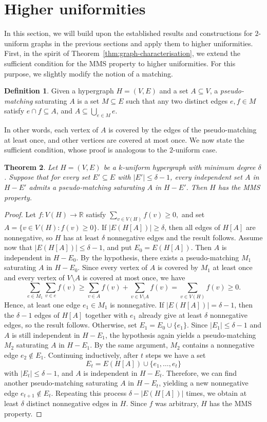 \documentclass[12pt,UKenglish]{amsart}
\newtheorem{thm}{Theorem}[section]
\theoremstyle{plain}
\theoremstyle{definition}
\newtheorem{defn}[thm]{Definition}
\theoremstyle{remark}
\begin{document}
\section{Higher uniformities}\label{sec:high-uniformities}
In this section, we will build upon the established results and constructions for $2$-uniform graphs in the previous sections and apply them to higher uniformities.
 First, in the spirit of Theorem~\ref{thm:graph-characterisation}, we extend the sufficient condition for the MMS property to higher uniformities.
 For this purpose, we slightly modify the notion of a matching.
 \begin{defn}
Given a hypergraph $H=(V,E)$ and a set $A\subseteq V$, a \textit{pseudo-matching} saturating $A$ is a set $M\subseteq E$ such that any two distinct edges $e,f\in M$ satisfy $e\cap f\subseteq A$, and
\(
A\subseteq \bigcup_{e\in M} e.
\)
 \end{defn}
In other words, each vertex of $A$ is covered by the edges of the pseudo-matching at least once, and other vertices are covered at most once. We now state the sufficient condition, whose proof is analogous to the $2$-uniform case.
 \begin{thm}\label{thm:pseudo-matching-sufficient}
Let \(H=(V,E)\) be a \(k\)-uniform hypergraph with minimum degree \(\delta\).
 Suppose that for every set \(E'\subseteq E\) with \(|E'|\le \delta-1\), every independent set \(A\) in \(H-E'\) admits a pseudo-matching saturating \(A\) in \(H-E'\).
 Then \(H\) has the MMS property.
\end{thm}
\begin{proof}
   Let \(f:V(H)\to \mathbb R\) satisfy
\(
\sum_{v\in V(H)} f(v)\ge 0,
\)
and set
\(
A=\{v\in V(H): f(v)\ge 0\}.
\)
If \(|E(H[A])|\ge \delta\), then all edges of \(H[A]\) are nonnegative, so \(H\) has at least \(\delta\) nonnegative edges and the result follows.
 Assume now that \(|E(H[A])|\le \delta-1\), and put \(E_0=E(H[A])\). Then \(A\) is independent in \(H-E_0\).
 By the hypothesis, there exists a pseudo-matching \(M_1\) saturating \(A\) in \(H-E_0\).
 Since every vertex of \(A\) is covered by \(M_1\) at least once and every vertex of \(V\setminus A\) is covered at most once, we have
\[
\sum_{e\in M_1}\sum_{v\in e} f(v)
\ge
\sum_{v\in A} f(v)+\sum_{v\in V\setminus A} f(v)
=
\sum_{v\in V(H)} f(v)\ge 0.
\]
Hence, at least one edge \(e_1\in M_1\) is nonnegative.
 If \(|E(H[A])|=\delta-1\), then the \(\delta-1\) edges of \(H[A]\) together with \(e_1\) already give at least \(\delta\) nonnegative edges, so the result follows.
 Otherwise, set \(E_1=E_0\cup\{e_1\}\). Since \(|E_1|\le \delta-1\) and \(A\) is still independent in \(H-E_1\), the hypothesis again yields a pseudo-matching \(M_2\) saturating \(A\) in \(H-E_1\).
 By the same argument, \(M_2\) contains a nonnegative edge \(e_2\notin E_1\).
 Continuing inductively, after \(t\) steps we have a set
\[
E_t=E(H[A])\cup\{e_1,\dots,e_t\}
\]
with \(|E_t|\le \delta-1\), and \(A\) is independent in \(H-E_t\).
 Therefore, we can find another pseudo-matching saturating \(A\) in \(H-E_t\), yielding a new nonnegative edge \(e_{t+1}\notin E_t\).
 Repeating this process \(\delta-|E(H[A])|\) times, we obtain at least \(\delta\) distinct nonnegative edges in \(H\).
 Since \(f\) was arbitrary, \(H\) has the MMS property.
\end{proof}
\end{document}

